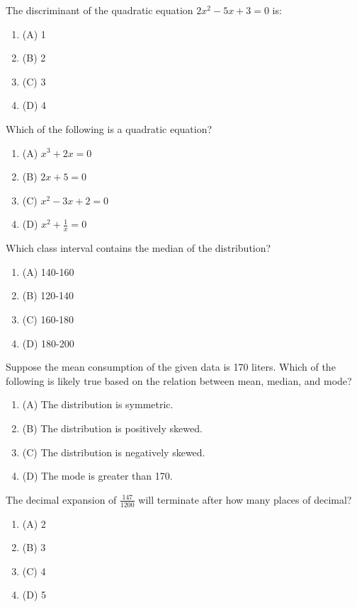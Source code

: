 \documentclass[12pt,a4paper]{exam}
\begin{document}
\begin{questions}
\question[1] The discriminant of the quadratic equation $2x^2 - 5x + 3 = 0$ is:
\begin{enumerate}[label=(\Alph*)]
  \item (A) 1
  \item (B) 2
  \item (C) 3
  \item (D) 4
\end{enumerate}
\vspace{0.15cm}

\question[1] Which of the following is a quadratic equation?
\begin{enumerate}[label=(\Alph*)]
  \item (A) $x^3 + 2x = 0$
  \item (B) $2x + 5 = 0$
  \item (C) $x^2 - 3x + 2 = 0$
  \item (D) $x^2 + \frac{1}{x} = 0$
\end{enumerate}
\vspace{0.15cm}

\question[4] Which class interval contains the median of the distribution?
\begin{enumerate}[label=(\Alph*)]
  \item (A) 140-160
  \item (B) 120-140
  \item (C) 160-180
  \item (D) 180-200
\end{enumerate}
\vspace{0.15cm}

\question[4] Suppose the mean consumption of the given data is 170 liters. Which of the following is likely true based on the relation between mean, median, and mode?
\begin{enumerate}[label=(\Alph*)]
  \item (A) The distribution is symmetric.
  \item (B) The distribution is positively skewed.
  \item (C) The distribution is negatively skewed.
  \item (D) The mode is greater than 170.
\end{enumerate}
\vspace{0.15cm}

\question[1] The decimal expansion of $\frac{147}{1200}$ will terminate after how many places of decimal?
\begin{enumerate}[label=(\Alph*)]
  \item (A) 2
  \item (B) 3
  \item (C) 4
  \item (D) 5
\end{enumerate}
\vspace{0.15cm}


\end{questions}
\end{document}
